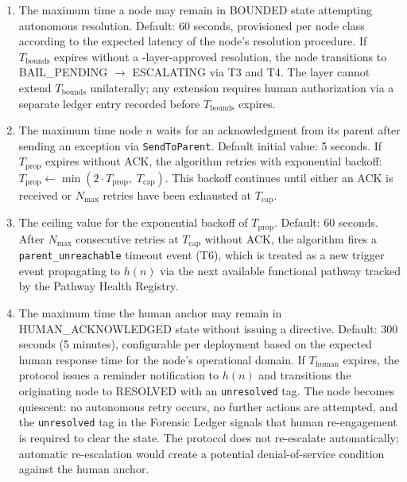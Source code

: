 \begin{enumerate}\itemsep=0pt
\item[\textbf{$T_{\text{bounds}}$ — Bounds Engine resolution timeout.}] The maximum time a node may remain in BOUNDED state attempting autonomous resolution. Default: 60 seconds, provisioned per node class according to the expected latency of the node's resolution procedure. If $T_{\text{bounds}}$ expires without a \fact-layer-approved resolution, the node transitions to BAIL\_PENDING $\rightarrow$ ESCALATING via T3 and T4. The \fact{} layer cannot extend $T_{\text{bounds}}$ unilaterally; any extension requires human authorization via a separate ledger entry recorded before $T_{\text{bounds}}$ expires.

\item[\textbf{$T_{\text{prop}}$ — Per-hop propagation timeout.}] The maximum time node $n$ waits for an acknowledgment from its parent after sending an exception via \texttt{SendToParent}. Default initial value: 5 seconds. If $T_{\text{prop}}$ expires without ACK, the algorithm retries with exponential backoff: $T_{\text{prop}} \leftarrow \min(2 \cdot T_{\text{prop}},\; T_{\text{cap}})$. This backoff continues until either an ACK is received or $N_{\max}$ retries have been exhausted at $T_{\text{cap}}$.

\item[\textbf{$T_{\text{cap}}$ — Maximum propagation timeout value.}] The ceiling value for the exponential backoff of $T_{\text{prop}}$. Default: 60 seconds. After $N_{\max}$ consecutive retries at $T_{\text{cap}}$ without ACK, the algorithm fires a \texttt{parent\_unreachable} timeout event (T6), which is treated as a new trigger event propagating to $h(n)$ via the next available functional pathway tracked by the Pathway Health Registry.

\item[\textbf{$T_{\text{human}}$ — Human acknowledgment timeout.}] The maximum time the human anchor may remain in HUMAN\_ACKNOWLEDGED state without issuing a directive. Default: 300 seconds (5 minutes), configurable per deployment based on the expected human response time for the node's operational domain. If $T_{\text{human}}$ expires, the protocol issues a reminder notification to $h(n)$ and transitions the originating node to RESOLVED with an \texttt{unresolved} tag. The node becomes quiescent: no autonomous retry occurs, no further actions are attempted, and the \texttt{unresolved} tag in the Forensic Ledger signals that human re-engagement is required to clear the state. The protocol does not re-escalate automatically; automatic re-escalation would create a potential denial-of-service condition against the human anchor.
\end{enumerate}

